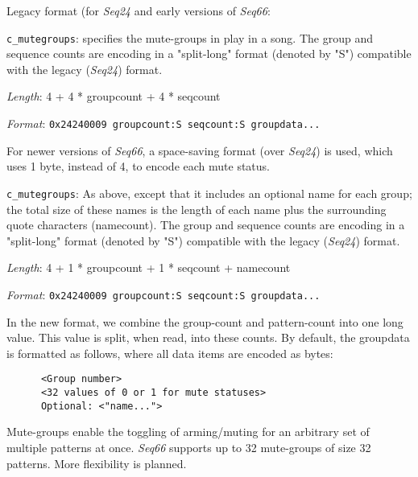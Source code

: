    Legacy format (for \textsl{Seq24} and early versions of \textsl{Seq66}:

   \begin{description}
      \item \texttt{c\_mutegroups}: specifies the mute-groups in play in a song.
         The group and sequence counts are encoding in
         a "split-long" format (denoted by "S") compatible with the legacy
         (\textsl{Seq24}) format.
      \item \textsl{Length}: 4 + 4 * groupcount + 4 * seqcount
      \item \textsl{Format}: \texttt{0x24240009 groupcount:S seqcount:S groupdata...}
   \end{description}

   For newer versions of \textsl{Seq66},
   a space-saving format (over \textsl{Seq24}) is used, which uses 1 byte,
   instead of 4, to encode each mute status.

   \begin{description}
      \item \texttt{c\_mutegroups}: As above, except that it
         includes an optional name for each group; the total size of these
         names is the length of each name plus the surrounding quote
         characters (namecount).  The group and sequence counts are encoding in
         a "split-long" format (denoted by "S") compatible with the legacy
         (\textsl{Seq24}) format.
      \item \textsl{Length}: 4 + 1 * groupcount + 1 * seqcount + namecount
      \item \textsl{Format}: \texttt{0x24240009 groupcount:S seqcount:S groupdata...}
   \end{description}

   In the new format, we combine the group-count and pattern-count into
   one long value. This value is split, when read, into these counts.
   By default, the groupdata is formatted as follows, where all data items are
   encoded as bytes:

   \begin{verbatim}
      <Group number>
      <32 values of 0 or 1 for mute statuses>
      Optional: <"name...">
   \end{verbatim}

   Mute-groups enable the toggling of arming/muting for an arbitrary set of
   multiple patterns at once.  \textsl{Seq66} supports up to 32 mute-groups of
   size 32 patterns.  More flexibility is planned.

